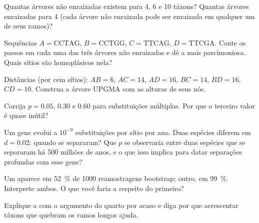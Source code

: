 \begin{exercise}[$\star$]\label{exo:b2:phylogenetic-trees:4}
Quantas árvores não enraizadas existem para 4, 6 e 10 táxons? Quantas
árvores enraizadas para 4 (cada árvore não enraizada pode ser enraizada
em qualquer um de seus ramos)?
\end{exercise}

\begin{exercise}[$\star\star$]\label{exo:b2:phylogenetic-trees:5}
Sequências $A = \mathrm{CCTAG}$, $B = \mathrm{CCTGG}$, $C =
\mathrm{TTCAG}$, $D = \mathrm{TTCGA}$. Conte os passos em cada uma das
três árvores não enraizadas e dê a mais parcimoniosa. Quais
sítios são homoplásicos nela?
\end{exercise}

\begin{exercise}[$\star\star$]\label{exo:b2:phylogenetic-trees:6}
Distâncias (por cem sítios): $AB = 6$, $AC = 14$, $AD = 16$,
$BC = 14$, $BD = 16$, $CD = 10$. Construa a árvore UPGMA com as alturas
de seus nós.
\end{exercise}

\begin{exercise}[$\star\star$]\label{exo:b2:phylogenetic-trees:7}
Corrija $p = 0.05$, $0.30$ e $0.60$ para substituições múltiplas. Por
que o terceiro valor é quase inútil?
\end{exercise}

\begin{exercise}[$\star\star$]\label{exo:b2:phylogenetic-trees:8}
Um gene evolui a $10^{-9}$ substituições por sítio por ano. Duas
espécies diferem em $d = 0.02$: quando se separaram? Que $p$ se
observaria entre duas espécies que se separaram há 500 milhões de anos,
e o que isso implica para datar separações profundas com esse gene?
\end{exercise}

\begin{exercise}[$\star\star$]\label{exo:b2:phylogenetic-trees:9}
Um  aparece em \qty{52}{\%} de \num{1000} reamostragens bootstrap;
outro, em \qty{99}{\%}. Interprete ambos. O que você faria a respeito
do primeiro?
\end{exercise}

\begin{exercise}[$\star\star\star$]\label{exo:b2:phylogenetic-trees:10}
Explique a  com o argumento do quarto por acaso
e diga por que acrescentar táxons que quebram os ramos longos ajuda.
\end{exercise}

